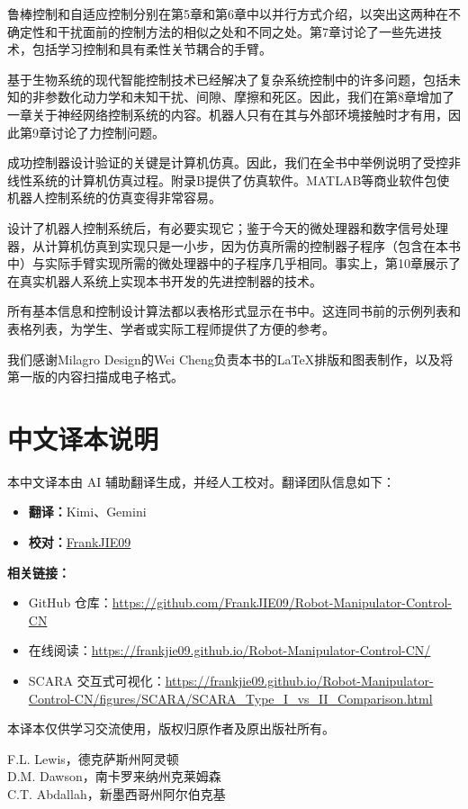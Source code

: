 \documentclass[UTF8,a4paper]{ctexart}
\begin{document}
鲁棒控制和自适应控制分别在第5章和第6章中以并行方式介绍，以突出这两种在不确定性和干扰面前的控制方法的相似之处和不同之处。第7章讨论了一些先进技术，包括学习控制和具有柔性关节耦合的手臂。

基于生物系统的现代智能控制技术已经解决了复杂系统控制中的许多问题，包括未知的非参数化动力学和未知干扰、间隙、摩擦和死区。因此，我们在第8章增加了一章关于神经网络控制系统的内容。机器人只有在其与外部环境接触时才有用，因此第9章讨论了力控制问题。

成功控制器设计验证的关键是计算机仿真。因此，我们在全书中举例说明了受控非线性系统的计算机仿真过程。附录B提供了仿真软件。MATLAB等商业软件包使机器人控制系统的仿真变得非常容易。

设计了机器人控制系统后，有必要实现它；鉴于今天的微处理器和数字信号处理器，从计算机仿真到实现只是一小步，因为仿真所需的控制器子程序（包含在本书中）与实际手臂实现所需的微处理器中的子程序几乎相同。事实上，第10章展示了在真实机器人系统上实现本书开发的先进控制器的技术。

所有基本信息和控制设计算法都以表格形式显示在书中。这连同书前的示例列表和表格列表，为学生、学者或实际工程师提供了方便的参考。

我们感谢Milagro Design的Wei Cheng负责本书的LaTeX排版和图表制作，以及将第一版的内容扫描成电子格式。

\section*{中文译本说明}

本中文译本由 AI 辅助翻译生成，并经人工校对。翻译团队信息如下：

\begin{itemize}
    \item \textbf{翻译：}Kimi、Gemini
    \item \textbf{校对：}\href{https://github.com/FrankJIE09}{FrankJIE09}
\end{itemize}

\textbf{相关链接：}
\begin{itemize}
    \item GitHub 仓库：\url{https://github.com/FrankJIE09/Robot-Manipulator-Control-CN}
    \item 在线阅读：\url{https://frankjie09.github.io/Robot-Manipulator-Control-CN/}
    \item SCARA 交互式可视化：\url{https://frankjie09.github.io/Robot-Manipulator-Control-CN/figures/SCARA/SCARA_Type_I_vs_II_Comparison.html}
\end{itemize}

本译本仅供学习交流使用，版权归原作者及原出版社所有。

\begin{flushright}
F.L. Lewis，德克萨斯州阿灵顿\\
D.M. Dawson，南卡罗来纳州克莱姆森\\
C.T. Abdallah，新墨西哥州阿尔伯克基
\end{flushright}

\ifstandalone
  
\end{document}
